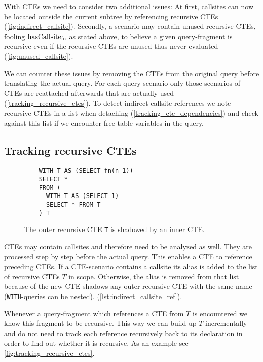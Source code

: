 With CTEs we need to consider two additional issues: At first, callsites can now be located outside the current subtree by referencing recursive CTEs (\autoref{fig:indirect_callsite}). Secondly, a scenario may contain unused recursive CTEs, fooling $\operatorname{\text{hasCallsite}_{fn}}$ as stated above, to believe a given query-fragment is recursive even if the recursive CTEs are unused thus never evaluated (\autoref{fig:unused_callsite}).

We can counter these issues by removing the CTEs from the original query before translating the actual query. For each query-scenario only those scenarios of CTEs are reattached afterwards that are actually used (\autoref{tracking_recursive_ctes}). To detect indirect callsite references we note recursive CTEs in a list when detaching (\autoref{tracking_cte_dependencies}) and check against this list if we encounter free table-variables in the query.

\subsection{Tracking recursive CTEs}\label{tracking_recursive_ctes}

\begin{wrapfigure}{r}{0.4\textwidth}
    \begin{verbatim}
    WITH T AS (SELECT fn(n-1))
    SELECT *
    FROM (
      WITH T AS (SELECT 1)
      SELECT * FROM T
    ) T
    \end{verbatim}
    \caption{The outer recursive CTE \texttt{T} is shadowed by an inner CTE.}
    \label{lst:indirect_callsite_ref}
\end{wrapfigure}

CTEs may contain callsites and therefore need to be analyzed as well. They are processed step by step before the actual query. This enables a CTE to reference preceding CTEs. If a CTE-scenario contains a callsite its alias is added to the list of recursive CTEs $T$ in scope. Otherwise, the alias is removed from that list because of the new CTE shadows any outer recursive CTE with the same name (\texttt{WITH}-queries can be nested). (\autoref{lst:indirect_callsite_ref}).

Whenever a query-fragment which references a CTE from $T$ is encountered we know this fragment to be recursive. This way we can build up $T$ incrementally and do not need to track each reference recursively back to its declaration in order to find out whether it is recursive. As an example see \autoref{fig:tracking_recursive_ctes}.

